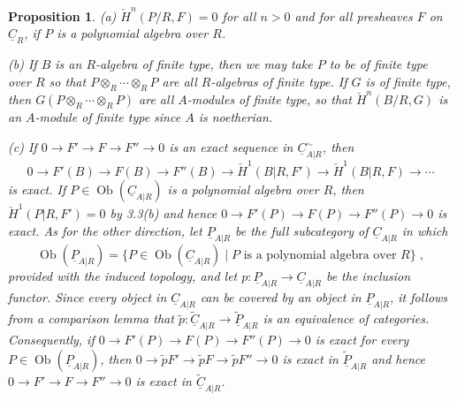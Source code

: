 \documentclass[11pt]{article}
\theoremstyle{plain}
\newtheorem{proposition}[theorem]{Proposition}
\theoremstyle{definition}
\theoremstyle{remark}
\DeclareMathOperator{\Ob}{Ob}
\begin{document}
\begin{proposition}
\textup{(a)} $\check{H}^n(P/R, F) = 0$ for all $n > 0$ and for all presheaves $F$ on $\underline{C}_{R}$, if $P$ is a polynomial algebra over $R$.

\textup{(b)} If $B$ is an $R$-algebra of finite type, then we may take $P$ to be of finite type over $R$ so that $P \otimes_R \cdots \otimes_R P$ are all $R$-algebras of finite type. If $G$ is of finite type, then $G(P \otimes_R \cdots \otimes_R P)$ are all $A$-modules of finite type, so that $\check{H}^n(B/R, G)$ is an $A$-module of finite type since $A$ is noetherian.

\textup{(c)} If $0 \to F' \to F \to F'' \to 0$ is an exact sequence in $\underline{C}_{A|R}^{\sim}$, then
\[
0 \to F'(B) \to F(B) \to F''(B) \to \check{H}^1(B|R, F') \to \check{H}^1(B|R, F) \to \cdots
\]
is exact. If $P \in \Ob(\underline{C}_{A|R})$ is a polynomial algebra over $R$, then $\check{H}^1(P|R, F') = 0$ by 3.3(b) and hence $0 \to F'(P) \to F(P) \to F''(P) \to 0$ is exact. As for the other direction, let $\underline{P}_{A|R}$ be the full subcategory of $\underline{C}_{A|R}$ in which
\[
\Ob(\underline{P}_{A|R}) = \{P \in \Ob(\underline{C}_{A|R}) \mid P \text{ is a polynomial algebra over } R\}\;,
\]
provided with the induced topology, and let $p : \underline{P}_{A|R} \to \underline{C}_{A|R}$ be the inclusion functor. Since every object in $\underline{C}_{A|R}$ can be covered by an object in $\underline{P}_{A|R}$, it follows from a comparison lemma that $\widetilde{p} : \widetilde{\underline{C}}_{A|R} \to \widetilde{\underline{P}}_{A|R}$ is an equivalence of categories. Consequently, if $0 \to F'(P) \to F(P) \to F''(P) \to 0$ is exact for every $P \in \Ob(\underline{P}_{A|R})$, then $0 \to \widetilde{p}F' \to \widetilde{p}F \to \widetilde{p}F'' \to 0$ is exact in $\widetilde{\underline{P}}_{A|R}$ and hence $0 \to F' \to F \to F'' \to 0$ is exact in $\widetilde{\underline{C}}_{A|R}$.
\end{proposition}
\end{document}
